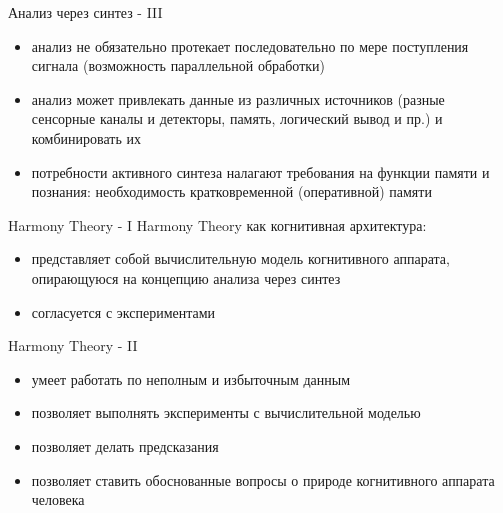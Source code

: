 \documentclass{beamer}
\begin{document}
\begin{frame}{Анализ через синтез - III}
\begin{itemize}
	\item анализ не обязательно протекает последовательно по мере поступления сигнала (возможность параллельной обработки)
	\medskip
	\item анализ может привлекать данные из различных источников (разные сенсорные каналы и детекторы, память, логический вывод и пр.) и комбинировать их
	\item потребности активного синтеза налагают требования на функции памяти и познания: необходимость кратковременной (оперативной) памяти
\end{itemize}
\end{frame}

\begin{frame}{Harmony Theory - I}
Harmony Theory как когнитивная архитектура:
\bigskip
\begin{itemize}
	\item представляет собой вычислительную модель когнитивного аппарата, опирающуюся на концепцию анализа через синтез
	\medskip
	\item согласуется с экспериментами
\end{itemize}
\end{frame}

\begin{frame}{Harmony Theory - II}
\begin{itemize}
	\item умеет работать по неполным и избыточным данным
	\medskip
	\item позволяет выполнять эксперименты с вычислительной моделью
	\medskip
	\item позволяет делать предсказания
	\medskip
	\item позволяет ставить обоснованные вопросы о природе когнитивного аппарата человека
\end{itemize}
\end{frame}
\end{document}
